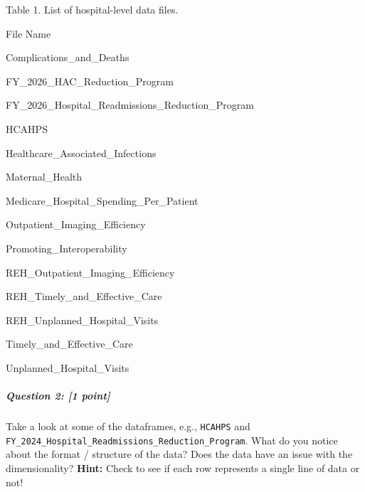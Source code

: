 \documentclass[
]{article}
\begin{document}
Table 1. List of hospital-level data files.

File Name

Complications\_and\_Deaths

FY\_2026\_HAC\_Reduction\_Program

FY\_2026\_Hospital\_Readmissions\_Reduction\_Program

HCAHPS

Healthcare\_Associated\_Infections

Maternal\_Health

Medicare\_Hospital\_Spending\_Per\_Patient

Outpatient\_Imaging\_Efficiency

Promoting\_Interoperability

REH\_Outpatient\_Imaging\_Efficiency

REH\_Timely\_and\_Effective\_Care

REH\_Unplanned\_Hospital\_Visits

Timely\_and\_Effective\_Care

Unplanned\_Hospital\_Visits

\subparagraph{\texorpdfstring{\textbf{Question 2}: {[}1
point{]}}{Question 2: {[}1 point{]}}}\label{question-2-1-point}

Take a look at some of the dataframes, e.g., \texttt{HCAHPS} and
\texttt{FY\_2024\_Hospital\_Readmissions\_Reduction\_Program}. What do
you notice about the format / structure of the data? Does the data have
an issue with the dimensionality? \textbf{Hint: }Check to see if each
row represents a single line of data or not!
\end{document}
